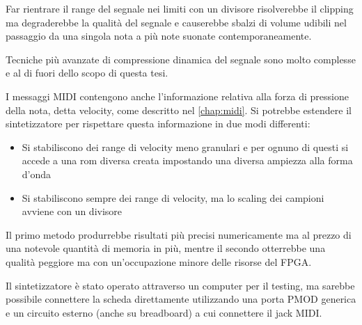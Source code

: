 Far rientrare il range del segnale nei limiti con un divisore risolverebbe
il clipping ma degraderebbe la qualità del segnale e causerebbe
sbalzi di volume udibili nel passaggio da una singola nota  a più note
suonate contemporaneamente.

Tecniche più avanzate di compressione dinamica del segnale 
sono molto complesse e al di fuori dello scopo di questa tesi.  

I messaggi MIDI contengono anche l'informazione relativa alla forza
di pressione della nota, detta velocity, come descritto nel \cref{chap:midi}.
Si potrebbe estendere il sintetizzatore per rispettare questa informazione
in due modi differenti:
\begin{itemize}
  \item Si stabiliscono dei range di velocity meno granulari  e per ognuno
        di questi si accede a una rom diversa creata impostando una diversa 
        ampiezza alla forma d'onda
  \item Si stabiliscono sempre dei range di velocity, ma lo scaling dei
        campioni avviene con un divisore
\end{itemize}
Il primo metodo produrrebbe risultati più precisi numericamente ma al
prezzo di una notevole quantità di memoria in più, mentre il secondo
otterrebbe una qualità peggiore ma con un'occupazione minore delle
risorse del FPGA.

Il sintetizzatore è stato operato attraverso un 
computer per il testing, ma sarebbe possibile connettere la scheda
direttamente utilizzando una porta PMOD generica e un circuito esterno
(anche su breadboard) a cui connettere il jack MIDI.
